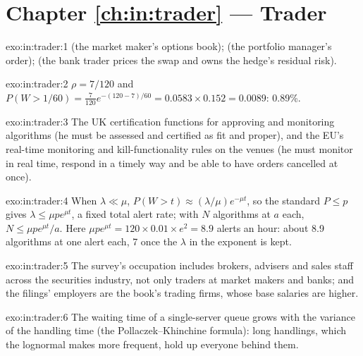 \section*{Chapter \ref{ch:in:trader} --- Trader}

\begin{solution}{exo:in:trader:1}
 (the market maker's options book);  (the portfolio manager's order);  (the bank
trader prices the swap and owns the hedge's residual risk).
\end{solution}

\begin{solution}{exo:in:trader:2}
$\rho=7/120$ and $P(W>1/60)=\frac{7}{120}e^{-(120-7)/60}=0.0583\times0.152=0.0089$: 0.89\%.
\end{solution}

\begin{solution}{exo:in:trader:3}
The UK certification functions for approving and monitoring algorithms (he must be assessed and certified as fit and
proper), and the EU's real-time monitoring and kill-functionality rules on the venues (he must monitor in real time,
respond in a timely way and be able to have orders cancelled at once).
\end{solution}

\begin{solution}{exo:in:trader:4}
When $\lambda\ll\mu$, $P(W>t)\approx(\lambda/\mu)e^{-\mu t}$, so the standard $P\le p$ gives $\lambda\le\mu pe^{\mu t}$, a
fixed total alert rate; with $N$ algorithms at $a$ each, $N\le\mu pe^{\mu t}/a$. Here $\mu pe^{\mu t}=120\times0.01\times
e^{2}=8.9$ alerts an hour: about 8.9 algorithms at one alert each, 7 once the $\lambda$ in the exponent is kept.
\end{solution}

\begin{solution}{exo:in:trader:5}
The survey's occupation includes brokers, advisers and sales staff across the securities industry, not only traders at
market makers and banks; and the filings' employers are the book's trading firms, whose base salaries are higher.
\end{solution}

\begin{solution}{exo:in:trader:6}
The waiting time of a single-server queue grows with the variance of the handling time (the Pollaczek--Khinchine
formula): long handlings, which the lognormal makes more frequent, hold up everyone behind them.
\end{solution}

